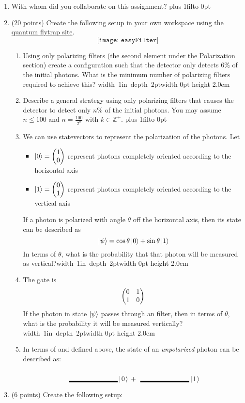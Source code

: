\documentclass[12pt]{article}
\newcommand{\Blank}{\mbox{\hskip 4pt\vrule width 1in depth 2pt}\vrule width 0pt height 2.0em}
\def\DefaultSpace{1in}
\newcommand{\LeaveSpace}[1][\DefaultSpace]{%
\vskip #1 plus 1fil\relax\hbox to 0pt{\hss} %
}
\begin{document}
\begin{enumerate}[font=\bfseries]
    \item With whom did you collaborate on this assignment?
    \LeaveSpace{}
    \item (20 points) Create the following setup in your own workspace using the \href{https://lab.quantumflytrap.com/lab}{quantum flytrap site}.
    \[\texttt{[image: easyFilter]}\]
    \begin{enumerate}[label=\theenumi.\arabic*]
        \item Using only polarizing filters (the second element under the Polarization section) create a configuration such that the detector only detects 6$\%$ of the initial photons. What is the minimum number of polarizing filters required to achieve this? \Blank{}
        \clearpage{}
        \item Describe a general strategy using only polarizing filters that causes the detector to detect only $n\%$ of the initial photons. You may assume $n \leq 100$ and $n = \frac{100}{2^k}$ with $k\in\mathbb{Z}^+$.\LeaveSpace[2in]{}
        \item We can use statevectors to represent the polarization of the photons. Let 
        \begin{itemize}
          \item $\ket{0} =\SQB{1}{0}$ represent photons completely oriented according to the horizontal axis
          \item $\ket{1} = \SQB{0}{1}$ represent photons completely oriented according to the vertical axis
        \end{itemize}
        If a photon is polarized with angle $\theta$ off the horizontal axis, then its state can be described as
        \[ \ket{\psi} = \cos{\theta}\ket{0} + \sin{\theta}\ket{1}\] 
        In terms of $\theta$, what is the probability that that photon will be measured as vertical?\Blank{}
       \item The \PauliX{} gate is
       \[ \XMatrix{} \]
       If the photon in state $\ket{\psi}$ passes through an \PauliX{} filter, then in terms
       of $\theta$, what is the probability it will be measured vertically?\Blank{}
        \item In terms of \QZero{} and \QOne{} defined above, the state of an \emph{unpolarized} photon can be described as:
        \[ \Blank{}\QZero{} + \Blank{}\QOne{} \]
    \end{enumerate}
    \item (6 points) Create the following setup:

\end{enumerate}
\end{document}
